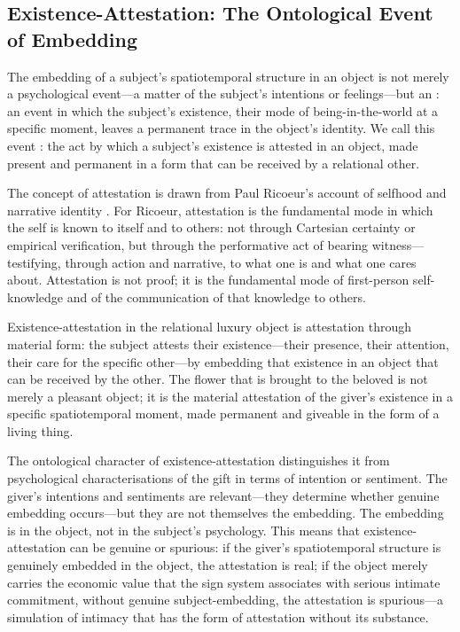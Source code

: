 \subsection{Existence-Attestation: The Ontological Event of Embedding}
\label{p16:subsec:attestation}

\noindent
The embedding of a subject's spatiotemporal structure in an object is not merely a psychological event---a matter of the subject's intentions or feelings---but an : an event in which the subject's existence, their mode of being-in-the-world at a specific moment, leaves a permanent trace in the object's identity. We call this event : the act by which a subject's existence is attested in an object, made present and permanent in a form that can be received by a relational other.

The concept of attestation is drawn from Paul Ricoeur's account of selfhood and narrative identity \parencite{ricoeur1992}. For Ricoeur, attestation is the fundamental mode in which the self is known to itself and to others: not through Cartesian certainty or empirical verification, but through the performative act of bearing witness---testifying, through action and narrative, to what one is and what one cares about. Attestation is not proof; it is the fundamental mode of first-person self-knowledge and of the communication of that knowledge to others.

Existence-attestation in the relational luxury object is attestation through material form: the subject attests their existence---their presence, their attention, their care for the specific other---by embedding that existence in an object that can be received by the other. The flower that is brought to the beloved is not merely a pleasant object; it is the material attestation of the giver's existence in a specific spatiotemporal moment, made permanent and giveable in the form of a living thing.

The ontological character of existence-attestation distinguishes it from psychological characterisations of the gift in terms of intention or sentiment. The giver's intentions and sentiments are relevant---they determine whether genuine embedding occurs---but they are not themselves the embedding. The embedding is in the object, not in the subject's psychology. This means that existence-attestation can be genuine or spurious: if the giver's spatiotemporal structure is genuinely embedded in the object, the attestation is real; if the object merely carries the economic value that the sign system associates with serious intimate commitment, without genuine subject-embedding, the attestation is spurious---a simulation of intimacy that has the form of attestation without its substance.

